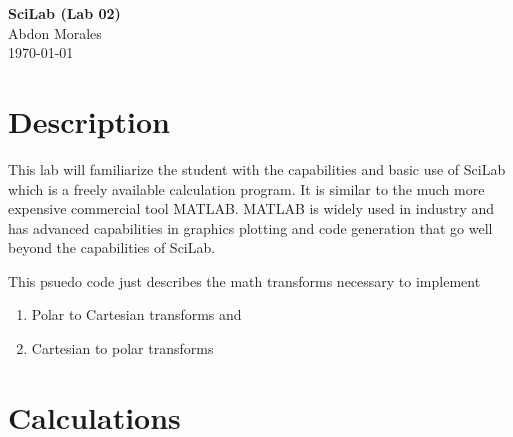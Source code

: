 \documentclass[11pt]{article}
\begin{document}
\begin{center}
    {\LARGE\bfseries SciLab (Lab 02)}\\[0.8em]
    {\large Abdon Morales}\\[0.3em]
    {\large \today}
\end{center}
\vspace{1em}

\section*{Description}
This lab will familiarize the student with the capabilities and basic use of SciLab which is a
freely available calculation program. It is similar to the much more expensive commercial tool
MATLAB. MATLAB is widely used in industry and has advanced capabilities in graphics
plotting and code generation that go well beyond the capabilities of SciLab.


This psuedo code just describes the math transforms necessary to implement
\begin{enumerate}
	\item Polar to Cartesian transforms and
	\item Cartesian to polar transforms
\end{enumerate}
\section*{Calculations}
\end{document}

